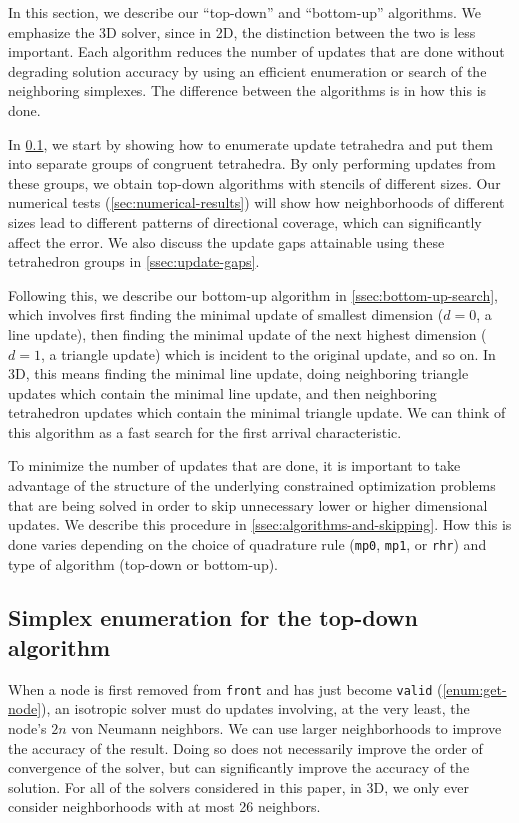\documentclass{article}
\begin{document}
In this section, we describe our ``top-down'' and ``bottom-up''
algorithms. We emphasize the 3D solver, since in 2D, the distinction
between the two is less important. Each algorithm reduces the number
of updates that are done without degrading solution accuracy by using
an efficient enumeration or search of the neighboring simplexes. The
difference between the algorithms is in how this is done.

In \cref{ssec:simplex-enumeration}, we start by showing how to
enumerate update tetrahedra and put them into separate groups of
congruent tetrahedra. By only performing updates from these groups, we
obtain top-down algorithms with stencils of different sizes. Our
numerical tests (\cref{sec:numerical-results}) will show how
neighborhoods of different sizes lead to different patterns of
directional coverage, which can significantly affect the error. We
also discuss the update gaps attainable using these tetrahedron groups
in \cref{ssec:update-gaps}.

Following this, we describe our bottom-up algorithm in
\cref{ssec:bottom-up-search}, which involves first finding the minimal
update of smallest dimension ($d = 0$, a line update), then finding
the minimal update of the next highest dimension ($d = 1$, a triangle
update) which is incident to the original update, and so on. In 3D,
this means finding the minimal line update, doing neighboring triangle
updates which contain the minimal line update, and then neighboring
tetrahedron updates which contain the minimal triangle update. We can
think of this algorithm as a fast search for the first arrival
characteristic.

To minimize the number of updates that are done, it is important to
take advantage of the structure of the underlying constrained
optimization problems that are being solved in order to skip
unnecessary lower or higher dimensional updates. We describe this
procedure in \cref{ssec:algorithms-and-skipping}. How this is done
varies depending on the choice of quadrature rule (\texttt{mp0},
\texttt{mp1}, or \texttt{rhr}) and type of algorithm (top-down or
bottom-up).

\subsection{Simplex enumeration for the top-down
  algorithm}\label{ssec:simplex-enumeration}

When a node is first removed from \texttt{front} and has just become
\texttt{valid} (\cref{enum:get-node}), an isotropic solver must do
updates involving, at the very least, the node's $2n$ von Neumann
neighbors. We can use larger neighborhoods to improve the accuracy of
the result. Doing so does not necessarily improve the order of
convergence of the solver, but can significantly improve the accuracy
of the solution. For all of the solvers considered in this paper, in
3D, we only ever consider neighborhoods with at most 26 neighbors.
\end{document}
